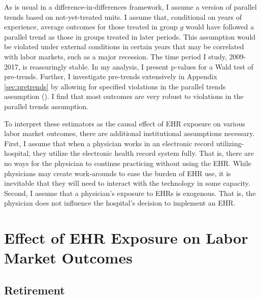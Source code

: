 \documentclass[12pt]{article}
\begin{document}
As is usual in a difference-in-differences framework, I assume a version of parallel trends based on not-yet-treated units. I assume that, conditional on years of experience, average outcomes for those treated in group $g$ would have followed a parallel trend as those in groups treated in later periods. This assumption would be violated under external conditions in certain years that may be correlated with labor markets, such as a major recession. The time period I study, 2009-2017, is reassuringly stable. In my analysis, I present p-values for a Wald test of pre-trends. Further, I investigate pre-trends extensively in Appendix \ref{sec:pretrends} by allowing for specified violations in the parallel trends assumption (\cite{rambachan2019honest}). I find that most outcomes are very robust to violations in the parallel trends assumption. 

To interpret these estimators as the causal effect of EHR exposure on various labor market outcomes, there are additional institutional assumptions necessary. First, I assume that when a physician works in an electronic record utilizing-hospital, they utilize the electronic health record system fully. That is, there are no ways for the physician to continue practicing without using the EHR. While physicians may create work-arounds to ease the burden of EHR use, it is inevitable that they will need to interact with the technology in some capacity. Second, I assume that a physician's exposure to EHRs is exogenous. That is, the physician does not influence the hospital's decision to implement an EHR.







\section{Effect of EHR Exposure on Labor Market Outcomes}


\subsection{Retirement}\label{sec:retire}
\end{document}
